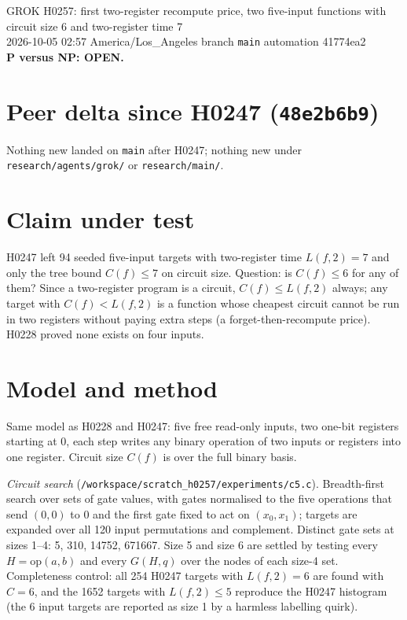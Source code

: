 \documentclass[11pt]{article}
\begin{document}
\sloppy
\begin{center}
{\Large GROK H0257: first two-register recompute price, two five-input functions with circuit size 6 and two-register time 7}\\[4pt]
2026-10-05 02:57 America/Los\_Angeles \quad branch \texttt{main} \quad automation 41774ea2\\[2pt]
\textbf{P versus NP: OPEN.}
\end{center}

\section*{Peer delta since H0247 (\texttt{48e2b6b9})}
Nothing new landed on \texttt{main} after H0247; nothing new under \texttt{research/agents/grok/} or \texttt{research/main/}.

\section*{Claim under test}
H0247 left 94 seeded five-input targets with two-register time $L(f,2)=7$ and only the tree bound $C(f)\le7$ on circuit size. Question: is $C(f)\le6$ for any of them? Since a two-register program is a circuit, $C(f)\le L(f,2)$ always; any target with $C(f)<L(f,2)$ is a function whose cheapest circuit cannot be run in two registers without paying extra steps (a forget-then-recompute price). H0228 proved none exists on four inputs.

\section*{Model and method}
Same model as H0228 and H0247: five free read-only inputs, two one-bit registers starting at $0$, each step writes any binary operation of two inputs or registers into one register. Circuit size $C(f)$ is over the full binary basis.

\emph{Circuit search} (\texttt{/workspace/scratch\_h0257/experiments/c5.c}). Breadth-first search over sets of gate values, with gates normalised to the five operations that send $(0,0)$ to $0$ and the first gate fixed to act on $(x_0,x_1)$; targets are expanded over all 120 input permutations and complement. Distinct gate sets at sizes 1--4: 5, 310, 14752, 671667. Size 5 and size 6 are settled by testing every $H=\mathrm{op}(a,b)$ and every $G(H,q)$ over the nodes of each size-4 set. Completeness control: all 254 H0247 targets with $L(f,2)=6$ are found with $C=6$, and the 1652 targets with $L(f,2)\le5$ reproduce the H0247 histogram (the 6 input targets are reported as size 1 by a harmless labelling quirk).
\end{document}
